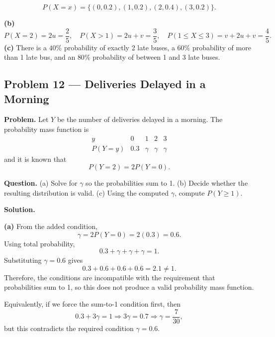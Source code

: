 \begin{ExamProblems}
		
\[
		P(X=x)=\{(0,0.2),(1,0.2),(2,0.4),(3,0.2)\}.
		\]
\begin{center}
		\end{center}
\textbf{(b)}
		\[
		P(X=2)=2u=\frac{2}{5},\quad
		P(X>1)=2u+v=\frac{3}{5},\quad
		P(1\le X\le 3)=v+2u+v=\frac{4}{5}.
		\]
		\textbf{(c)} There is a $40\%$ probability of exactly 2 late buses, a $60\%$ probability of more than 1 late bus, and an $80\%$ probability of between 1 and 3 late buses.
		
		
		\item
		\subsection*{Problem 12 — Deliveries Delayed in a Morning}
			\textbf{Problem.}
		Let $Y$ be the number of deliveries delayed in a morning. The probability mass function is
		\[
		\begin{array}{c|cccc}
			y & 0 & 1 & 2 & 3\\
			\hline
			P(Y=y) & 0.3 & \gamma & \gamma & \gamma
		\end{array}
		\]
		and it is known that
		\[
		P(Y=2)=2P(Y=0).
		\]
		
		\textbf{Question.}
		(a) Solve for $\gamma$ so the probabilities sum to 1.
		(b) Decide whether the resulting distribution is valid.
		(c) Using the computed $\gamma$, compute $P(Y\ge 1)$.
		
		\textbf{Solution.}

		\textbf{(a)} From the added condition,
		\[
		\gamma=2P(Y=0)=2(0.3)=0.6.
		\]
		Using total probability,
		\[
		0.3+\gamma+\gamma+\gamma=1.
		\]
		Substituting $\gamma=0.6$ gives
		\[
		0.3+0.6+0.6+0.6=2.1\neq 1.
		\]
		Therefore, the conditions are incompatible with the requirement that probabilities sum to 1, so this does not produce a valid probability mass function.
		
		Equivalently, if we force the sum-to-1 condition first, then
		\[
		0.3+3\gamma=1\Rightarrow 3\gamma=0.7\Rightarrow \gamma=\frac{7}{30},
		\]
		but this contradicts the required condition $\gamma=0.6$.
		

\end{ExamProblems}
